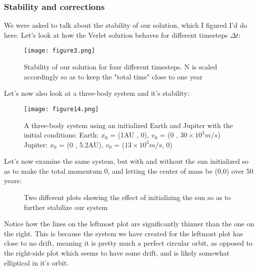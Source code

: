 \documentclass{article}
\begin{document}
\subsubsection*{Stability and corrections}
We were asked to talk about the stability of our solution, which I figured I'd do here.
\newline Let's look at how the Verlet solution behaves for different timesteps $\Delta t$:
\begin{figure}[ht!]
    \centering
    \texttt{[image: figure3.png]}
    \caption{Stability of our solution for four different timesteps. N is scaled accordingly so as to keep the "total time" close to one year}
    \label{fig8}
\end{figure} \newpage
Let's now also look at a three-body system and it's stability:
\begin{figure}[ht!]
    \centering
    \texttt{[image: figure14.png]}
    \caption{A three-body system using an initialized Earth and Jupiter with the initial conditions: \newline
    Earth: $x_0$ = (1AU , 0), $v_0$ = (0 , $30\times 10^3 m/s$) \newline
    Jupiter: $x_0$ = (0 , 5.2AU), $v_0$ = ($13\times10^3 m/s$, 0)}
    \label{fig8}
\end{figure} \newline
Let's now examine the same system, but with and without the sun initialized so as to make the total momentum 0, and letting the center of mass be (0,0) over 50 years:
\begin{figure}[ht!] \label{fig10}
\centering
{}
\caption{Two different plots showing the effect of initializing the sun so as to further stabilize our system}
\end{figure} \newline
Notice how the lines on the leftmost plot are significantly thinner than the one on the right. This is because the system we have created for the leftmost plot has close to no drift, meaning it is pretty much a perfect circular orbit, as opposed to the right-side plot which seems to have some drift, and is likely somewhat elliptical in it's orbit.
\newpage
\end{document}
